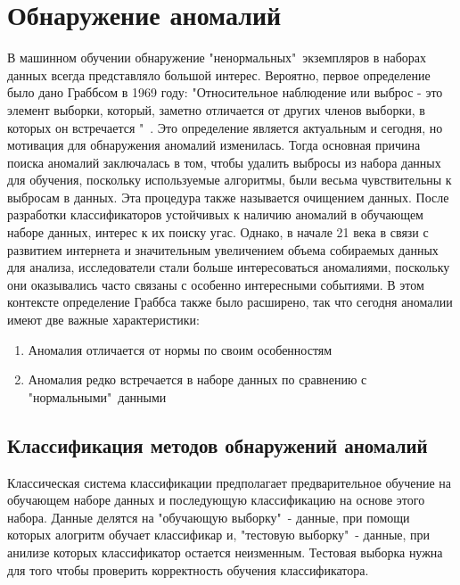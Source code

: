 \section{Обнаружение аномалий}
В машинном обучении обнаружение  "ненормальных"\ экземпляров в наборах данных всегда представляло большой интерес. Вероятно, первое определение было дано Граббсом\cite{Book02} в 1969 году: "Относительное наблюдение или выброс - это элемент выборки, который, заметно отличается от других членов выборки, в которых он встречается "\ .
Это определение является актуальным и сегодня, но мотивация для обнаружения аномалий изменилась. Тогда основная причина поиска аномалий заключалась в том, чтобы удалить выбросы из набора данных для обучения, поскольку   используемые алгоритмы, были весьма чувствительны к выбросам в данных. Эта процедура также называется очищением данных. После разработки классификаторов устойчивых к наличию аномалий в обучающем наборе данных, интерес к их поиску угас. Однако, в начале 21 века в связи с развитием интернета и значительным увеличением объема собираемых данных для анализа, исследователи стали больше интересоваться  аномалиями, поскольку они  оказывались часто связаны с особенно интересными событиями.  В этом контексте определение Граббса также было расширено, так что сегодня аномалии имеют две важные характеристики:
\begin{enumerate}
	\item Аномалия отличается от нормы по своим особенностям
	\item Аномалия редко встречается в наборе данных по сравнению с "нормальными"\  данными
\end{enumerate}
\subsection{Классификация методов обнаружений аномалий}
Классическая система классификации предполагает предварительное обучение на обучающем наборе данных и последующую классификацию на основе этого набора. Данные делятся на "обучающую выборку"\ - данные, при помощи которых алогритм обучает классификар и, "тестовую выборку"\ - данные, при анилизе которых классификатор остается неизменным. Тестовая выборка нужна для того чтобы проверить корректность обучения классификатора.

